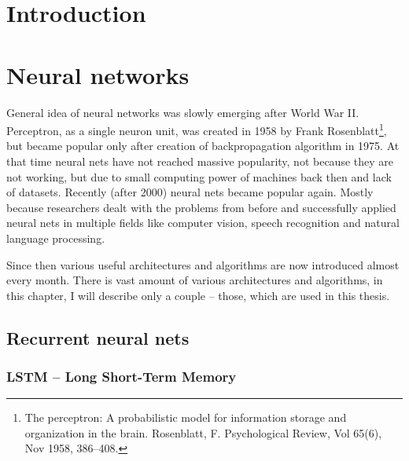
\chapter{Introduction}

\chapter{Neural networks} 
General idea of neural networks was slowly emerging after World War II. Perceptron, as a single neuron unit, was created in 1958 by Frank Rosenblatt\footnote{The perceptron: A probabilistic model for information storage and organization in the brain. Rosenblatt, F. Psychological Review, Vol 65(6), Nov 1958, 386--408.}, but became popular only after creation of backpropagation algorithm in 1975. At that time neural nets have not reached massive popularity, not because they are not working, but due to small computing power of machines back then and lack of datasets. Recently (after 2000) neural nets became popular again. Mostly because researchers dealt with the problems from before and successfully applied neural nets in multiple fields like computer vision, speech recognition and natural language processing.

Since then various useful architectures and algorithms are now introduced almost every month. There is vast amount of various architectures and algorithms, in this chapter, I will describe only a couple -- those, which are used in this thesis.

	\section{Recurrent neural nets}

		\subsection{LSTM -- Long Short-Term Memory}

